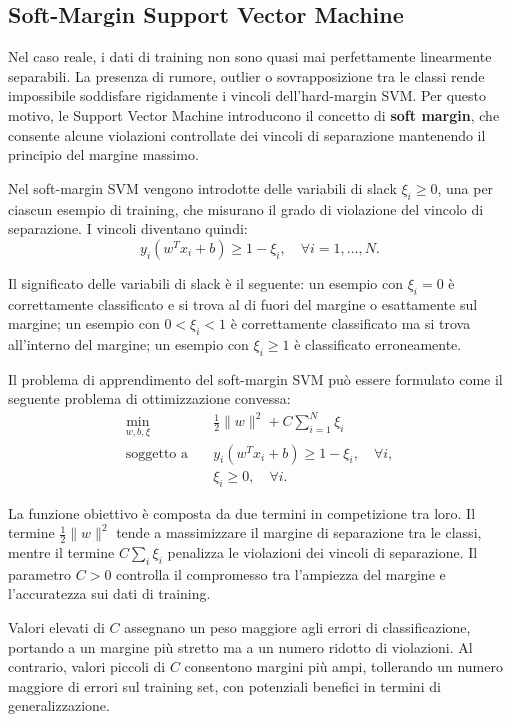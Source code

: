 \documentclass[a4paper,12pt]{report}
\begin{document}
\subsection{Soft-Margin Support Vector Machine}

Nel caso reale, i dati di training non sono quasi mai perfettamente linearmente separabili.
La presenza di rumore, outlier o sovrapposizione tra le classi rende impossibile soddisfare rigidamente i vincoli dell’hard-margin SVM.
Per questo motivo, le Support Vector Machine introducono il concetto di \textbf{soft margin}, che consente alcune violazioni controllate dei vincoli di separazione mantenendo il principio del margine massimo.

Nel soft-margin SVM vengono introdotte delle variabili di slack \( \xi_i \geq 0 \), una per ciascun esempio di training, che misurano il grado di violazione del vincolo di separazione.
I vincoli diventano quindi:
\[
y_i (w^T x_i + b) \geq 1 - \xi_i, \quad \forall i = 1,\dots,N.
\]

Il significato delle variabili di slack è il seguente:
un esempio con \( \xi_i = 0 \) è correttamente classificato e si trova al di fuori del margine o esattamente sul margine;
un esempio con \( 0 < \xi_i < 1 \) è correttamente classificato ma si trova all’interno del margine;
un esempio con \( \xi_i \geq 1 \) è classificato erroneamente.

Il problema di apprendimento del soft-margin SVM può essere formulato come il seguente problema di ottimizzazione convessa:
\[
\begin{aligned}
\min_{w,b,\xi} \quad & \frac{1}{2}\|w\|^2 + C \sum_{i=1}^{N} \xi_i \\
\text{soggetto a} \quad & y_i (w^T x_i + b) \geq 1 - \xi_i, \quad \forall i, \\
& \xi_i \geq 0, \quad \forall i.
\end{aligned}
\]

La funzione obiettivo è composta da due termini in competizione tra loro.
Il termine \( \frac{1}{2}\|w\|^2 \) tende a massimizzare il margine di separazione tra le classi, mentre il termine \( C \sum_i \xi_i \) penalizza le violazioni dei vincoli di separazione.
Il parametro \( C > 0 \) controlla il compromesso tra l’ampiezza del margine e l’accuratezza sui dati di training.

Valori elevati di \( C \) assegnano un peso maggiore agli errori di classificazione, portando a un margine più stretto ma a un numero ridotto di violazioni.
Al contrario, valori piccoli di \( C \) consentono margini più ampi, tollerando un numero maggiore di errori sul training set, con potenziali benefici in termini di generalizzazione.
\end{document}

